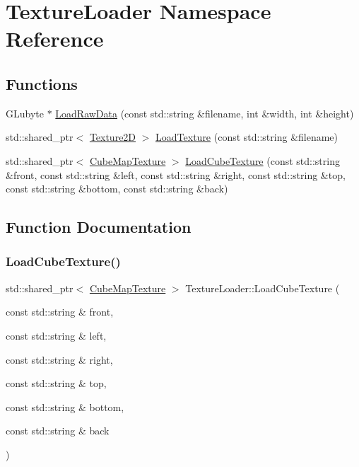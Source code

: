 \hypertarget{namespace_texture_loader}{}\section{Texture\+Loader Namespace Reference}
\label{namespace_texture_loader}
\subsection*{Functions}
\begin{DoxyCompactItemize}
\item 
G\+Lubyte $\ast$ \hyperlink{namespace_texture_loader_a1dd0802d2fc0d1169aa6899334ee5d0d}{Load\+Raw\+Data} (const std\+::string \&filename, int \&width, int \&height)
\item 
std\+::shared\+\_\+ptr$<$ \hyperlink{class_texture2_d}{Texture2D} $>$ \hyperlink{namespace_texture_loader_aed2af32d44d07368f1f426c4274418c0}{Load\+Texture} (const std\+::string \&filename)
\item 
std\+::shared\+\_\+ptr$<$ \hyperlink{class_cube_map_texture}{Cube\+Map\+Texture} $>$ \hyperlink{namespace_texture_loader_a11b8d1adadeb0cd549313edf6be161e3}{Load\+Cube\+Texture} (const std\+::string \&front, const std\+::string \&left, const std\+::string \&right, const std\+::string \&top, const std\+::string \&bottom, const std\+::string \&back)
\end{DoxyCompactItemize}


\subsection{Function Documentation}
\hypertarget{namespace_texture_loader_a11b8d1adadeb0cd549313edf6be161e3}{}\label{namespace_texture_loader_a11b8d1adadeb0cd549313edf6be161e3} 
\subsubsection{\texorpdfstring{Load\+Cube\+Texture()}{LoadCubeTexture()}}
{\footnotesize\ttfamily std\+::shared\+\_\+ptr$<$ \hyperlink{class_cube_map_texture}{Cube\+Map\+Texture} $>$ Texture\+Loader\+::\+Load\+Cube\+Texture (\begin{DoxyParamCaption}\item[{const std\+::string \&}]{front,  }\item[{const std\+::string \&}]{left,  }\item[{const std\+::string \&}]{right,  }\item[{const std\+::string \&}]{top,  }\item[{const std\+::string \&}]{bottom,  }\item[{const std\+::string \&}]{back }\end{DoxyParamCaption})}

